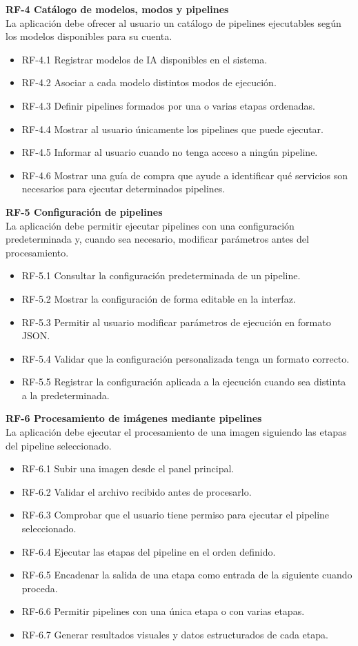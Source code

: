 \textbf{RF-4 Catálogo de modelos, modos y pipelines}\\
La aplicación debe ofrecer al usuario un catálogo de pipelines ejecutables según los modelos disponibles para su cuenta.

\begin{itemize}
	\item RF-4.1 Registrar modelos de IA disponibles en el sistema.
	\item RF-4.2 Asociar a cada modelo distintos modos de ejecución.
	\item RF-4.3 Definir pipelines formados por una o varias etapas ordenadas.
	\item RF-4.4 Mostrar al usuario únicamente los pipelines que puede ejecutar.
	\item RF-4.5 Informar al usuario cuando no tenga acceso a ningún pipeline.
	\item RF-4.6 Mostrar una guía de compra que ayude a identificar qué servicios son necesarios para ejecutar determinados pipelines.
\end{itemize}

\textbf{RF-5 Configuración de pipelines}\\
La aplicación debe permitir ejecutar pipelines con una configuración predeterminada y, cuando sea necesario, modificar parámetros antes del procesamiento.

\begin{itemize}
	\item RF-5.1 Consultar la configuración predeterminada de un pipeline.
	\item RF-5.2 Mostrar la configuración de forma editable en la interfaz.
	\item RF-5.3 Permitir al usuario modificar parámetros de ejecución en formato JSON.
	\item RF-5.4 Validar que la configuración personalizada tenga un formato correcto.
	\item RF-5.5 Registrar la configuración aplicada a la ejecución cuando sea distinta a la predeterminada.
\end{itemize}

\textbf{RF-6 Procesamiento de imágenes mediante pipelines}\\
La aplicación debe ejecutar el procesamiento de una imagen siguiendo las etapas del pipeline seleccionado.

\begin{itemize}
	\item RF-6.1 Subir una imagen desde el panel principal.
	\item RF-6.2 Validar el archivo recibido antes de procesarlo.
	\item RF-6.3 Comprobar que el usuario tiene permiso para ejecutar el pipeline seleccionado.
	\item RF-6.4 Ejecutar las etapas del pipeline en el orden definido.
	\item RF-6.5 Encadenar la salida de una etapa como entrada de la siguiente cuando proceda.
	\item RF-6.6 Permitir pipelines con una única etapa o con varias etapas.
	\item RF-6.7 Generar resultados visuales y datos estructurados de cada etapa.
\end{itemize}

